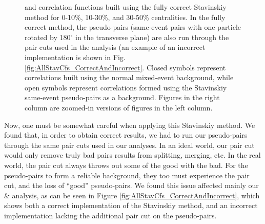 \documentclass[/home/jesse/Analysis/FemtoAnalysis/AnalysisNotes/AnalysisNoteJBuxton.tex]{subfiles}
\begin{document}
\begin{figure}[h!]
  \caption[\LamK Stavinskiy Correlation Functions (Correct)]{\LamK and \ALamAK correlation functions built using the fully correct Stavinskiy method for 0-10\%, 10-30\%, and 30-50\% centralities.  In the fully correct method, the pseudo-pairs (same-event pairs with one particle rotated by 180$^\circ$ in the transverse plane) are also run through the pair cuts used in the analysis (an example of an incorrect implementation is shown in Fig. \ref{fig:AllStavCfs_CorrectAndIncorrect}.  Closed symbols represent correlations built using the normal mixed-event background, while open symbols represent correlations formed using the Stavinskiy same-event pseudo-pairs as a background.  Figures in the right column are zoomed-in versions of figures in the left column.}
  \label{fig:AllStavCfs_Correct}
\end{figure}




Now, one must be somewhat careful when applying this Stavinskiy method.  We found that, in order to obtain correct results, we had to run our pseudo-pairs through the same pair cuts used in our analyses.  In an ideal world, our pair cut would only remove truly bad pairs results from splitting, merging, etc.  In the real world, the pair cut always throws out some of the good with the bad.  For the pseudo-pairs to form a reliable background, they too must experience the pair cut, and the loss of ``good'' pseudo-pairs.  We found this issue affected mainly our \LamKchP \& \ALamKchM analysis, as can be seen in Figure \ref{fig:AllStavCfs_CorrectAndIncorrect}, which shows both a correct implementation of the Stavinskiy method, and an incorrect implementation lacking the additional pair cut on the pseudo-pairs.
\end{document}

